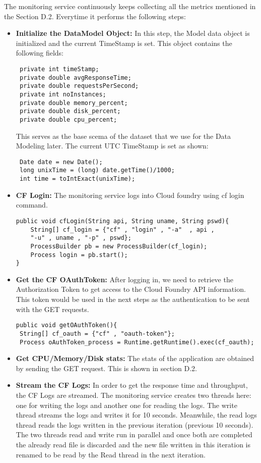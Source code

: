 \documentclass[article,type=msc,colorback,12pt,accentcolor=tud7b,table]{tudthesis}
\begin{document}
	The monitoring service continuously keeps collecting all the metrics mentioned in the Section D.2. Everytime it performs the following steps:
	\begin{itemize}
		\item{\textbf{Initialize the DataModel Object:}} In this step, the Model data object is initialized and the current TimeStamp is set. This object contains the following fields: 
\begin{lstlisting}
 private int timeStamp;
 private double avgResponseTime;
 private double requestsPerSecond;
 private int noInstances;
 private double memory_percent;
 private double disk_percent;
 private double cpu_percent;
\end{lstlisting}
This serves as the base scema of the dataset that we use for the Data Modeling later. The current UTC TimeStamp is set as shown: 
\begin{lstlisting}
 Date date = new Date();			   
 long unixTime = (long) date.getTime()/1000;
 int time = toIntExact(unixTime);
\end{lstlisting}

\item{\textbf{CF Login:}} The monitoring service logs into Cloud foundry using cf login command.
\begin{lstlisting}
public void cfLogin(String api, String uname, String pswd){
	String[] cf_login = {"cf" , "login" , "-a"  , api , 
	"-u" , uname , "-p" , pswd};
	ProcessBuilder pb = new ProcessBuilder(cf_login);
	Process login = pb.start();
}
\end{lstlisting}
\item{\textbf{Get the CF OAuthToken:}} After logging in, we need to retrieve the Authorization Token to get access to the Cloud Foundry API information. This token would be used in the next steps as the authentication to be sent with the GET requests.
\begin{lstlisting}
public void getOAuthToken(){				
 String[] cf_oauth = {"cf" , "oauth-token"};			
 Process oAuthToken_process = Runtime.getRuntime().exec(cf_oauth);
\end{lstlisting}
		
\item{\textbf{Get CPU/Memory/Disk stats:}} 
The stats of the application are obtained by sending the GET request. This is shown in section D.2.
		
\item{\textbf{Stream the CF Logs:}} In order to get the response time and throughput, the CF Logs are streamed. The monitoring service creates two threads here: one for writing the logs and another one for reading the logs. The write thread streams the logs and writes it for 10 seconds. Meanwhile, the read logs thread reads the logs written in the previous iteration (previous 10 seconds). The two threads read and write run in parallel and once both are completed the already read file is discarded and the new file written in this iteration is renamed to be read by the Read thread in the next iteration.


\end{itemize}
\end{document}
